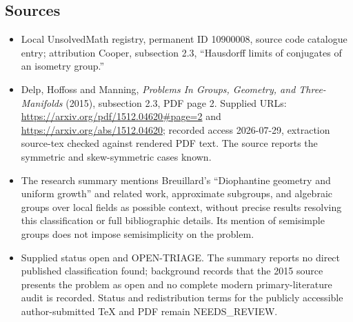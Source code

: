 \documentclass[11pt]{article}
\begin{document}
\subsection{Sources}
\begin{itemize}
\item Local UnsolvedMath registry, permanent ID 10900008, source code catalogue entry; attribution Cooper, subsection 2.3, ``Hausdorff limits of conjugates of an isometry group.''
\item Delp, Hoffoss and Manning, \emph{Problems In Groups, Geometry, and Three-Manifolds} (2015), subsection 2.3, PDF page 2. Supplied URLs: \url{https://arxiv.org/pdf/1512.04620#page=2} and \url{https://arxiv.org/abs/1512.04620}; recorded access 2026-07-29, extraction source-tex checked against rendered PDF text. The source reports the symmetric and skew-symmetric cases known.
\item The research summary mentions Breuillard's ``Diophantine geometry and uniform growth'' and related work, approximate subgroups, and algebraic groups over local fields as possible context, without precise results resolving this classification or full bibliographic details. Its mention of semisimple groups does not impose semisimplicity on the problem.
\item Supplied status open and OPEN-TRIAGE. The summary reports no direct published classification found; background records that the 2015 source presents the problem as open and no complete modern primary-literature audit is recorded. Status and redistribution terms for the publicly accessible author-submitted TeX and PDF remain NEEDS\_REVIEW.
\end{itemize}
\end{document}
